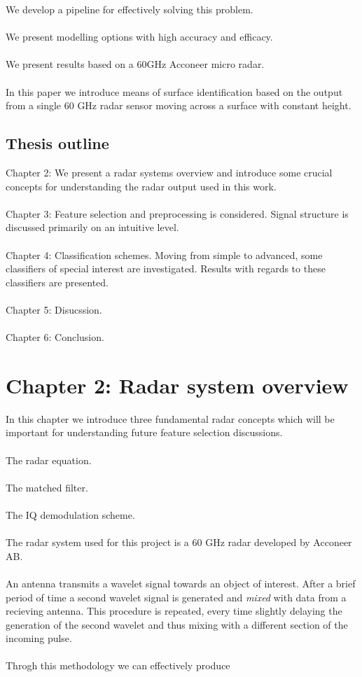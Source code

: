 \documentclass[a4paper, 12pt]{article}
\begin{document}
We develop a pipeline for effectively solving this problem. 
\\ \\
We present modelling options with high accuracy and efficacy. 
\\ \\ 
We present results based on a 60GHz Acconeer micro radar. 
\\ \\
In this paper we introduce means of surface identification based on the output from a single 60 GHz radar sensor moving across a surface with constant height. 

\subsection{Thesis outline}

Chapter 2: We present a radar systems overview and introduce some crucial concepts for understanding the radar output used in this work. 
\\ \\
Chapter 3: Feature selection and preprocessing is considered. Signal structure is discussed primarily on an intuitive level. 
\\ \\
Chapter 4: Classification schemes. Moving from simple to advanced, some classifiers of special interest are investigated. Results with regards to these classifiers are presented.
\\ \\
Chapter 5: Disucssion.
\\ \\
Chapter 6: Conclusion.

\section{Chapter 2: Radar system overview}

In this chapter we introduce three fundamental radar concepts which will be important for understanding future feature selection discussions. 
\\ \\
The radar equation.
\\ \\
The matched filter.
\\ \\
The IQ demodulation scheme. 
\\ \\
The radar system used for this project is a 60 GHz radar developed by Acconeer AB.
\\ \\
An antenna transmits a wavelet signal towards an object of interest. After a brief period of time a second wavelet signal is generated and \emph{mixed} with data from a recieving antenna. This procedure is repeated, every time slightly delaying the generation of the second wavelet and thus mixing with a different section of the incoming pulse. 
\\ \\
Throgh this methodology we can effectively produce
\end{document}
